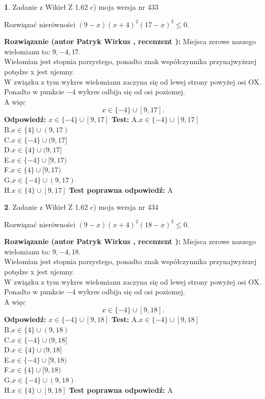\documentclass[12pt, a4paper]{article}
\theoremstyle{definition} %
\newtheorem{zad}{}
\newcommand{\zadStart}[1]{\begin{zad}#1\newline}
\newcommand{\zadStop}{\end{zad}}
\newcommand{\rozwStart}[2]{\noindent \textbf{Rozwiązanie (autor #1 , recenzent #2): }\newline}
\newcommand{\rozwStop}{\newline}
\newcommand{\odpStart}{\noindent \textbf{Odpowiedź:}\newline}
\newcommand{\odpStop}{\newline}
\newcommand{\testStart}{\noindent \textbf{Test:}\newline}
\newcommand{\testStop}{\newline}
\newcommand{\kluczStart}{\noindent \textbf{Test poprawna odpowiedź:}\newline}
\newcommand{\kluczStop}{\newline}
\begin{document}
\zadStart{Zadanie z Wikieł Z 1.62 c) moja wersja nr 433}

Rozwiązać nierówności $(9-x)(x+4)^{2}(17-x)^{3}\le0$.
\zadStop
\rozwStart{Patryk Wirkus}{}
Miejsca zerowe naszego wielomianu to: $9, -4, 17$.\\
Wielomian jest stopnia parzystego, ponadto znak współczynnika przy\linebreak najwyższej potędze x jest ujemny.\\ W związku z tym wykres wielomianu zaczyna się od lewej strony powyżej osi OX.\\
Ponadto w punkcie $-4$ wykres odbija się od osi poziomej.\\
A więc $$x \in \{-4\} \cup [9,17].$$
\rozwStop
\odpStart
$x \in \{-4\} \cup [9,17]$
\odpStop
\testStart
A.$x \in \{-4\} \cup [9,17]$\\
B.$x \in \{4\} \cup (9,17)$\\
C.$x \in \{-4\} \cup (9,17]$\\
D.$x \in \{4\} \cup (9,17]$\\
E.$x \in \{-4\} \cup [9,17)$\\
F.$x \in \{4\} \cup [9,17)$\\
G.$x \in \{-4\} \cup (9,17)$\\
H.$x \in \{4\} \cup [9,17]$
\testStop
\kluczStart
A
\kluczStop



\zadStart{Zadanie z Wikieł Z 1.62 c) moja wersja nr 434}

Rozwiązać nierówności $(9-x)(x+4)^{2}(18-x)^{3}\le0$.
\zadStop
\rozwStart{Patryk Wirkus}{}
Miejsca zerowe naszego wielomianu to: $9, -4, 18$.\\
Wielomian jest stopnia parzystego, ponadto znak współczynnika przy\linebreak najwyższej potędze x jest ujemny.\\ W związku z tym wykres wielomianu zaczyna się od lewej strony powyżej osi OX.\\
Ponadto w punkcie $-4$ wykres odbija się od osi poziomej.\\
A więc $$x \in \{-4\} \cup [9,18].$$
\rozwStop
\odpStart
$x \in \{-4\} \cup [9,18]$
\odpStop
\testStart
A.$x \in \{-4\} \cup [9,18]$\\
B.$x \in \{4\} \cup (9,18)$\\
C.$x \in \{-4\} \cup (9,18]$\\
D.$x \in \{4\} \cup (9,18]$\\
E.$x \in \{-4\} \cup [9,18)$\\
F.$x \in \{4\} \cup [9,18)$\\
G.$x \in \{-4\} \cup (9,18)$\\
H.$x \in \{4\} \cup [9,18]$
\testStop
\kluczStart
A
\kluczStop
\end{document}
